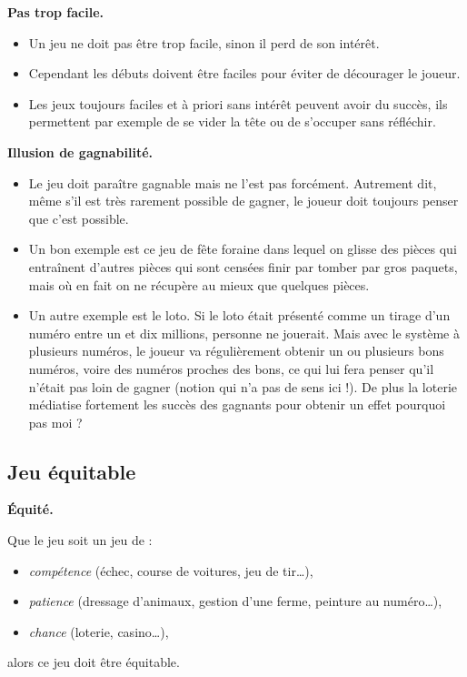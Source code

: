 \documentclass[11pt,class=report,crop=false]{standalone}
\begin{document}
\medskip

\textbf{Pas trop facile.}
\begin{itemize}
	\item Un jeu ne doit pas être trop facile, sinon il perd de son intérêt.
	\item Cependant les débuts doivent être faciles pour éviter de décourager le joueur.
	\item Les jeux toujours faciles et à priori sans intérêt peuvent avoir du succès, ils permettent par exemple de se vider la tête ou de s'occuper sans réfléchir.
\end{itemize}

\medskip

\textbf{Illusion de gagnabilité.}
\begin{itemize}
	\item Le jeu doit paraître gagnable mais ne l'est pas forcément.
	Autrement dit, même s'il est très rarement possible de gagner, le joueur doit toujours penser que c'est possible.
	
	\item Un bon exemple est ce jeu de fête foraine dans lequel on glisse des pièces qui entraînent d'autres pièces qui sont censées finir par tomber par gros paquets, mais où en fait on ne récupère au mieux que quelques pièces.
	
	\item Un autre exemple est le loto. Si le loto était présenté comme un tirage d'un numéro entre un et dix millions, personne ne jouerait. Mais avec le système à plusieurs numéros, le joueur va régulièrement obtenir un ou plusieurs bons numéros, voire des numéros proches des bons, ce qui lui fera penser qu'il n'était pas loin de gagner (notion qui n'a pas de sens ici !). De plus la loterie médiatise fortement les succès des gagnants pour obtenir un effet \og{}pourquoi pas moi ?\fg{}	
\end{itemize}

\subsection{Jeu équitable}

\textbf{Équité.}

Que le jeu soit un jeu de :
\begin{itemize}
	\item \emph{compétence} (échec, course de voitures, jeu de tir\ldots), 
	\item \emph{patience} (dressage d'animaux, gestion d'une ferme, peinture au numéro\ldots),
	\item \emph{chance} (loterie, casino\ldots),
\end{itemize}
alors ce jeu doit être équitable.
\end{document}
